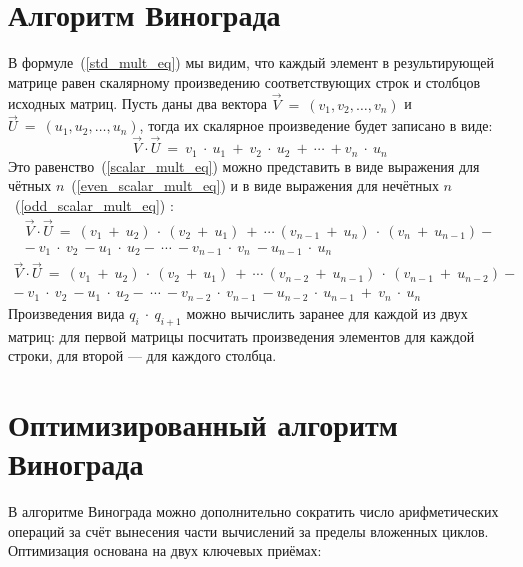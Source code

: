 \section{Алгоритм Винограда}
В формуле~(\ref{std_mult_eq}) мы видим, что каждый элемент в результирующей матрице равен скалярному произведению соответствующих строк и столбцов исходных матриц.
Пусть даны два вектора $\overrightarrow{V}~=~(v_1, v_2, \dots, v_n)$ и $\overrightarrow{U}~=~(u_1, u_2, \dots, u_n)$, тогда их скалярное произведение будет записано в виде:
\begin{equation}
	\label{scalar_mult_eq}
	\overrightarrow{V}\cdot\overrightarrow{U}~=~v_1~\cdot~u_1~+~v_2~\cdot~u_2~+~\cdots~+v_n~\cdot~u_n
\end{equation}
Это равенство~(\ref{scalar_mult_eq}) можно представить в виде выражения для чётных $n$~(\ref{even_scalar_mult_eq})  и в виде выражения для нечётных $n$~(\ref{odd_scalar_mult_eq}) :
\begin{equation}
	\label{even_scalar_mult_eq}
	\begin{matrix}
		\overrightarrow{V}\cdot\overrightarrow{U}~=~(v_1~+~u_2)~\cdot~(v_2~+~u_1)~+~\cdots~(v_{n-1}~+~u_{n})~\cdot~(v_{n}~+~u_{n-1})- \\ -~v_1~\cdot~v_2~-u_1~\cdot~u_2-~\cdots~-v_{n-1}~\cdot~v_{n}~-u_{n-1}~\cdot~u_{n}
	\end{matrix}
\end{equation}
\begin{equation}
	\label{odd_scalar_mult_eq}
	\begin{matrix}
		\overrightarrow{V}\cdot\overrightarrow{U}~=~(v_1~+~u_2)~\cdot~(v_2~+~u_1)~+~\cdots~(v_{n-2}~+~u_{n-1})~\cdot~(v_{n-1}~+~u_{n-2})-\\  -~v_1~\cdot~v_2~-u_1~\cdot~u_2-~\cdots~-v_{n-2}~\cdot~v_{n-1}~-u_{n-2}~\cdot~u_{n-1}~+~v_n~\cdot~u_n
	\end{matrix}
\end{equation}
Произведения вида $q_{i}~\cdot~q_{i+1}$ можно вычислить заранее для каждой из двух матриц: для первой матрицы посчитать произведения элементов для каждой строки, для второй --- для каждого столбца.


\section{Оптимизированный алгоритм Винограда}
В алгоритме Винограда можно дополнительно сократить число арифметических операций за счёт вынесения части вычислений за пределы вложенных циклов. 
Оптимизация основана на двух ключевых приёмах:


